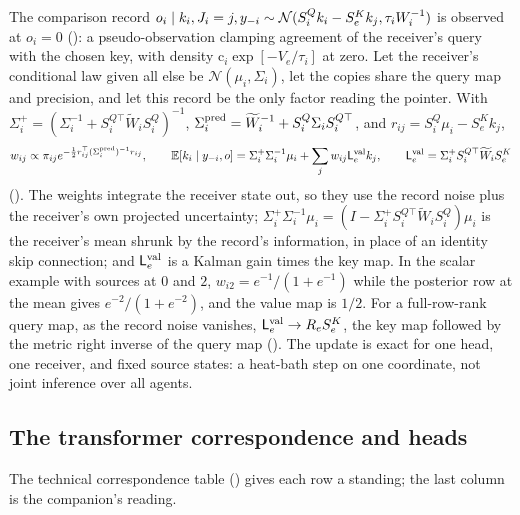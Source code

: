 The comparison record $o_i\mid k_i,J_i=j,y_{-i}\sim\mathcal N(S^Q_ik_i-S^K_ek_j,\tau_iW_i^{-1})$ is observed at $o_i=0$
(): a pseudo-observation clamping agreement of the receiver's query with the
chosen key, with density $\mathrm c_i\exp[-V_e/\tau_i]$ at zero. Let the receiver's conditional law given all else be
$\mathcal N(\mu_i,\Sigma_i)$, let the copies share the query map and precision, and let this record be the only factor
reading the pointer. With $\Sigma^+_i=(\Sigma_i^{-1}+S^{Q\top}_i\widetilde W_iS^Q_i)^{-1}$,
$\Sigma^{\rm pred}_i=\widetilde W_i^{-1}+S^Q_i\Sigma_iS^{Q\top}_i$, and $r_{ij}=S^Q_i\mu_i-S^K_ek_j$,
\[
w_{ij}\propto\pi_{ij}e^{-\frac12r_{ij}^\top(\Sigma^{\rm pred}_i)^{-1}r_{ij}},
\qquad
\mathbb E[k_i\mid y_{-i},o]=\Sigma^+_i\Sigma_i^{-1}\mu_i+\sum_jw_{ij}\mathsf L^{\rm val}_ek_j,
\qquad
\mathsf L^{\rm val}_e=\Sigma^+_iS^{Q\top}_i\widetilde W_iS^K_e
\]
(). The weights integrate the receiver state out, so they use the record noise
plus the receiver's own projected uncertainty; $\Sigma^+_i\Sigma_i^{-1}\mu_i=(I-\Sigma^+_iS^{Q\top}_i\widetilde W_iS^Q_i)\mu_i$
is the receiver's mean shrunk by the record's information, in place of an identity skip connection; and
$\mathsf L^{\rm val}_e$ is a Kalman gain times the key map. In the scalar example with sources at $0$ and $2$,
$w_{i2}=e^{-1}/(1+e^{-1})$ while the posterior row at the mean gives $e^{-2}/(1+e^{-2})$, and the value map is $1/2$. For a
full-row-rank query map, as the record noise vanishes, $\mathsf L^{\rm val}_e\to R_eS^K_e$, the key map followed by the metric right inverse of the
query map (). The update is exact for one head, one receiver, and fixed source states: a
heat-bath step on one coordinate, not joint inference over all agents.

\subsection{The transformer correspondence and heads}
\label{comp:ch06-transformer}

The technical correspondence table () gives each row a standing; the last column is
the companion's reading.

